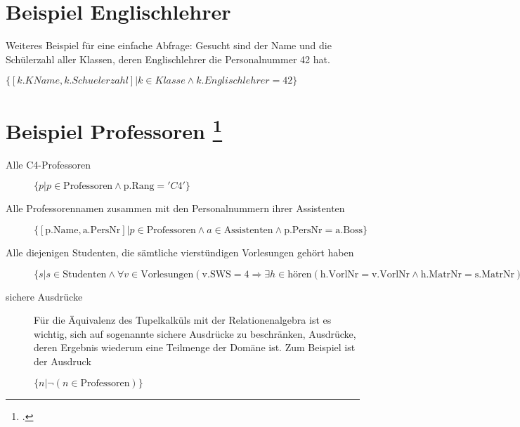 \documentclass{lehramt-informatik-haupt}
\begin{document}
\section{Beispiel Englischlehrer}

Weiteres Beispiel für eine einfache Abfrage: Gesucht sind der Name
und die Schülerzahl aller Klassen, deren Englischlehrer die
Personalnummer 42 hat.

$\{[k.KName, k.Schuelerzahl] | k \in Klasse \land k.Englischlehrer = 42\}$

%

\section{Beispiel Professoren
\footcite{net:html:uni-osnabrueck:dbs-skript}}

\begin{description}
\item[Alle C4-Professoren]
$\{p | p \in \text{Professoren} \land \text{p.Rang} = 'C4'\}$

\item[Alle Professorennamen zusammen mit den Personalnummern ihrer
Assistenten]

$\{[\text{p.Name}, \text{a.PersNr}] | p \in \text{Professoren} \land
a \in \text{Assistenten} \land \text{p.PersNr} = \text{a.Boss}\}$

\item[Alle diejenigen Studenten, die sämtliche vierstündigen Vorlesungen
gehört haben]

$\{s | s \in \text{Studenten} \land \forall
v \in \text{Vorlesungen}(\text{v.SWS} = 4 \Rightarrow
\exists h \in \text{hören}(\text{h.VorlNr} = \text{v.VorlNr} \land
\text{h.MatrNr} = \text{s.MatrNr}))\}$

\item[sichere Ausdrücke]

Für die Äquivalenz des Tupelkalküls mit der Relationenalgebra ist es
wichtig, sich auf sogenannte sichere Ausdrücke zu beschränken, \dh
Ausdrücke, deren Ergebnis wiederum eine Teilmenge der Domäne ist. Zum
Beispiel ist der Ausdruck

$\{n | \neg (n \in \text{Professoren})\}$

\end{description}

\literatur
\end{document}
